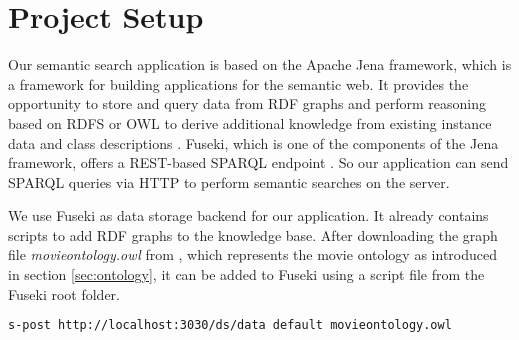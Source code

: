 \section{Project Setup}
Our semantic search application is based on the Apache Jena framework, which is a framework for building applications for the semantic web. %
It provides the opportunity to store \cite{jena:tdb} and query \cite{jena:arq} data from RDF graphs and perform reasoning based on RDFS or OWL to derive additional knowledge from existing instance data and class descriptions \cite{jena:inference, jena:ontology}. Fuseki, which is one of the components of the Jena framework, offers a REST-based SPARQL endpoint \cite{jena:fuseki}. So our application can send SPARQL queries via HTTP to perform semantic searches on the server.







We use Fuseki as data storage backend for our application. It already contains scripts to add RDF graphs to the knowledge base. After downloading the graph file \textit{movieontology.owl} from \cite{bouza:movieontology}, which represents the movie ontology as introduced in section \ref{sec:ontology}, it can be added to Fuseki using a script file from the Fuseki root folder.
\begin{lstlisting}[language=bash]
s-post http://localhost:3030/ds/data default movieontology.owl
\end{lstlisting}

